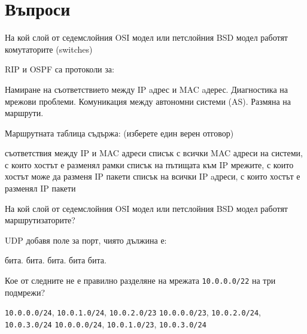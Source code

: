 \section*{Въпроси}

\begin{questions}


  \question[6] На кой слой от седемслойния OSI модел или петслойния BSD модел
  работят комутаторите (\foreignlanguage{english}{switches})
  \begin{oneparchoices}
  \end{oneparchoices}

  \question[6] RIP и OSPF са протоколи за:
  \begin{choices}
    \choice Намиране на съответствието между IP aдрес и MAC aдерес.
    \choice Диагностика на мрежови проблеми.
    \choice Комуникация между автономни системи (AS).
    \CorrectChoice Размяна на маршрути.
  \end{choices}

  \question[6] Маршрутната таблица съдържа: (изберете един верен отговор)
  \begin{choices}
    \choice съответствия между IP и MAC адреси
    \choice списък с всички MAC адреси на системи, с които хостът е разменял
    рамки
    \CorrectChoice списък на пътищата към IP мрежите, с които хостът може да
    разменя IP пакети
    \choice списък на всички IP aдреси, с които хостът е разменял IP пакети
  \end{choices}

  \question[6] На кой слой от седемслойния OSI модел или петслойния BSD модел
  работят маршрутизаторите?
  \begin{oneparchoices}
  \end{oneparchoices}

  \question[6] UDP добавя поле за порт, чиято дължина е:
  \begin{oneparchoices}
     бита.
     бита.
     бита.
     бита
     бита.
  \end{oneparchoices}

  \question[10] Кое от следните не е правилно разделяне на мрежата
  \texttt{10.0.0.0/22} на три подмрежи?

  \begin{choices}
    \choice \texttt{10.0.0.0/24}, \texttt{10.0.1.0/24}, \texttt{10.0.2.0/23}
    \CorrectChoice \texttt{10.0.0.0/23}, \texttt{10.0.2.0/24}, \texttt{10.0.3.0/24}
    \choice \texttt{10.0.0.0/24}, \texttt{10.0.1.0/23}, \texttt{10.0.3.0/24}
  \end{choices}


\end{questions}

